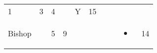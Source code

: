 \documentclass[12pt]{article}
\begin{document}
\begin{longtable}[]{@{}llllllllll@{}}
\begin{minipage}[t]{0.06\columnwidth}
1
\strut\end{minipage} &
\begin{minipage}[t]{0.06\columnwidth}\raggedright\strut
3
\strut\end{minipage} &
\begin{minipage}[t]{0.06\columnwidth}\raggedright\strut
4
\strut\end{minipage} &
\begin{minipage}[t]{0.06\columnwidth}\raggedright\strut
\strut\end{minipage} &
\begin{minipage}[t]{0.07\columnwidth}\raggedright\strut
Y
\strut\end{minipage} &
\begin{minipage}[t]{0.08\columnwidth}\raggedright\strut
15
\strut\end{minipage}\tabularnewline
\begin{minipage}[t]{0.13\columnwidth}\raggedright\strut
Bishop
\strut\end{minipage} &
\begin{minipage}[t]{0.06\columnwidth}\raggedright\strut
\strut\end{minipage} &
\begin{minipage}[t]{0.06\columnwidth}\raggedright\strut
5
\strut\end{minipage} &
\begin{minipage}[t]{0.06\columnwidth}\raggedright\strut
9
\strut\end{minipage} &
\begin{minipage}[t]{0.06\columnwidth}\raggedright\strut
\strut\end{minipage} &
\begin{minipage}[t]{0.06\columnwidth}\raggedright\strut
\strut\end{minipage} &
\begin{minipage}[t]{0.06\columnwidth}\raggedright\strut
\strut\end{minipage} &
\begin{minipage}[t]{0.06\columnwidth}\raggedright\strut
\strut\end{minipage} &
\begin{minipage}[t]{0.07\columnwidth}\raggedright\strut
\begin{itemize}
\item
\end{itemize}
\strut\end{minipage} &
\begin{minipage}[t]{0.08\columnwidth}\raggedright\strut
14
\strut\end{minipage}\tabularnewline

\end{longtable}
\end{document}
